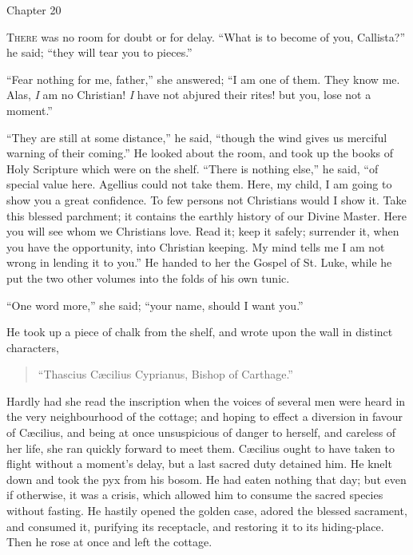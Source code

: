 Chapter 20


T\textsc{here} was no room for doubt or for delay. ``What is to
become of you, Callista?'' he said; ``they will tear you to
pieces.''

``Fear nothing for me, father,'' she answered; ``I am
one of them. They know me. Alas, \emph{I} am no Christian! \emph{I} have
not abjured their rites! but you, lose not a moment.''

``They are still at some distance,'' he said, ``though
the wind gives us merciful warning of their coming.'' He looked
about the room, and took up the books of Holy Scripture which were on
the shelf. ``There is nothing else,'' he said, ``of
special value here. Agellius could not take them. Here, my child, I am
going to show you a great confidence. To few persons not Christians
would I show it. Take this blessed parchment; it contains the earthly
history of our Divine Master. Here you will see whom we Christians
love. Read it; keep it safely; surrender it, when you have the
opportunity, into Christian keeping. My mind tells me I am not wrong
in lending it to you.'' He handed to her the Gospel of St. Luke,
while he put the two other volumes into the folds of his own
tunic.

``One word more,'' she said; ``your name, should I want
you.''

He took up a piece of chalk from the shelf, and wrote upon the wall
in distinct characters,

\begin{quote}

``Thascius Cæcilius Cyprianus, Bishop of Carthage.''

\end{quote}

Hardly had she read the inscription when the voices of several men
were heard in the very neighbourhood of the cottage; and hoping to
effect a diversion in favour of Cæcilius, and being at once
unsuspicious of danger to herself, and careless of her life, she ran
quickly forward to meet them. Cæcilius ought to have taken to flight
without a moment's delay, but a last sacred duty detained him. He
knelt down and took the pyx from his bosom. He had eaten nothing that
day; but even if otherwise, it was a crisis, which allowed him to
consume the sacred species without fasting. He hastily opened the
golden case, adored the blessed sacrament, and consumed it, purifying
its receptacle, and restoring it to its hiding-place. Then he rose at
once and left the cottage.

